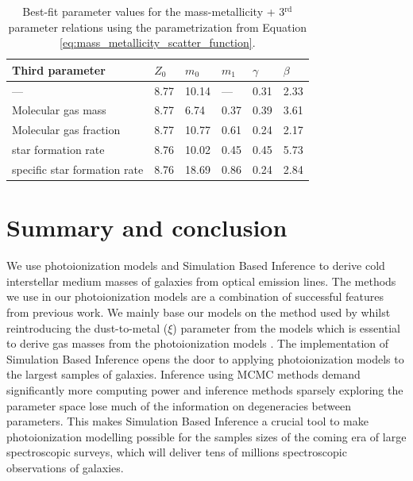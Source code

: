 \documentclass[fleqn,usenatbib]{mnras}
\begin{document}
\begin{table}
 \centering
 \caption{Best-fit parameter values for the mass-metallicity + 3$^{\textrm{rd}}$ parameter relations using the parametrization from Equation \ref{eq:mass_metallicity_scatter_function}.}
 \label{tab:mzr_best_fits}
\begin{tabular}{llllll}
\hline
\hline
\textbf{Third parameter}      & \textbf{$Z_0$} & \textbf{$m_0$} & \textbf{$m_1$} & \textbf{$\gamma$} & \textbf{$\beta$} \\ \hline
---                           & 8.77           & 10.14          & ---            & 0.31              & 2.33             \\
Molecular gas mass            & 8.77           & 6.74           & 0.37           & 0.39              & 3.61             \\
Molecular gas fraction        & 8.77           & 10.77          & 0.61           & 0.24              & 2.17             \\
star formation rate           & 8.76           & 10.02          & 0.45           & 0.45              & 5.73             \\
specific star formation rate  & 8.76           & 18.69          & 0.86           & 0.24              & 2.84             \\
\hline
\end{tabular}
\end{table}


\section{Summary and conclusion}
\label{sec:conclusion}
We use photoionization models and Simulation Based Inference to derive cold interstellar medium masses of galaxies from optical emission lines. The methods we use in our photoionization models are a combination of successful features from previous work. We mainly base our models on the method used by \cite{byler2017} whilst reintroducing the dust-to-metal ($\xi$) parameter from the \cite{charlot2001} models which is essential to derive gas masses from the photoionization models \citep{brinchmann2013}. The implementation of Simulation Based Inference opens the door to applying photoionization models to the largest samples of galaxies. Inference using MCMC methods demand significantly more computing power and inference methods sparsely exploring the parameter space lose much of the information on degeneracies between parameters. This makes Simulation Based Inference a crucial tool to make photoionization modelling possible for the samples sizes of the coming era of large spectroscopic surveys, which will deliver tens of millions spectroscopic observations of galaxies.
\end{document}

